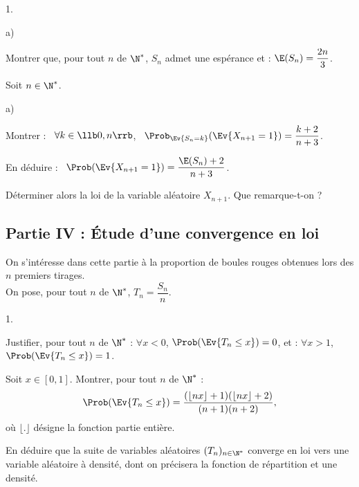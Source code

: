 \documentclass[11pt]{article}%
\begin{document}
\begin{noliste}{1.}
\begin{noliste}{a)}
    
  \end{noliste}




\item Montrer que, pour tout $n$ de $\N^*$, $S_n$ admet une espérance
  et : $\E(S_n) = \dfrac{2n}{3}$.

  

\item Soit $n \in \N^*$.
  \begin{noliste}{a)}
  \item Montrer : \ $\forall k \in \llb 0, n \rrb$, \ $\Prob_{\Ev{S_n
        = k}}(\Ev{X_{n+1} = 1}) = \dfrac{k+2}{n+3}$.
    
    
        



  \item En déduire : \ $\Prob(\Ev{X_{n+1} = 1}) = \dfrac{\E(S_n) +
      2}{n+3}$.
      
      

  \item Déterminer alors la loi de la variable aléatoire
    $X_{n+1}$. Que remarque-t-on ?
    
            
  \end{noliste}
\end{noliste}


\subsection*{Partie IV : Étude d'une convergence en loi}
\noindent
On s'intéresse dans cette partie à la proportion de boules rouges 
obtenues lors des $n$ premiers tirages.\\[.1cm]
On pose, pour tout $n$ de $\N^*$, $T_n=\dfrac{S_n}{n}$.
\begin{noliste}{1.}
\setcounter{enumi}{10}
\item Justifier, pour tout $n$ de $\N^*$ : $\forall x<0$, 
$\Prob(\Ev{T_n\leq 
x})=0$, et : $\forall x>1$, $\Prob(\Ev{T_n\leq x})=1$.



\item Soit $x\in[0,1]$. Montrer, pour tout $n$ de $\N^*$ :
\[
\Prob(\Ev{T_n\leq x})=\frac{(\lfloor nx\rfloor +1)(\lfloor nx\rfloor 
+2)}{(n+1)(n+2)},
\]
où $\lfloor . \rfloor$ désigne la fonction partie entière.



\item En déduire que la suite de variables aléatoires 
$(T_n)_{n\in\N^*}$ 
converge en loi vers une variable aléatoire à densité, dont on 
précisera 
la fonction de répartition et une densité.


\end{noliste}
\end{document}
